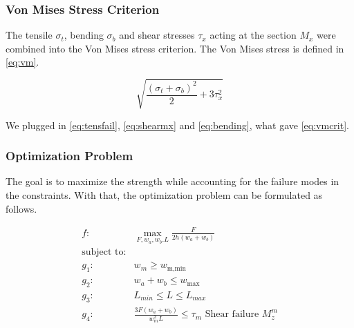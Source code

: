 \subsubsection{Von Mises Stress Criterion}
The tensile $\sigma_t$, bending $\sigma_b$ and shear stresses $\tau_x$ acting at the section $M_x$ were combined into the Von Mises stress criterion. The Von Mises stress is defined in \autoref{eq:vm}.

\begin{equation}
	\label{eq:vm}
	\sqrt{\frac{\left( \sigma_t + \sigma_b \right)^2}{2} + 3\tau_x ^2}
\end{equation}

We plugged in \autoref{eq:tensfail}, \ref{eq:shearmx} and \ref{eq:bending}, what gave \ref{eq:vmcrit}.

\begin{table}[H]
\end{table}


\subsubsection{Optimization Problem}
The goal is to maximize the strength while accounting for the failure modes in the constraints.
With that, the optimization problem can be formulated as follows. 

\begin{align*}
	f: & \max_{F, {w_a}, {w_b}. L} \frac{F}{2h \left(w_a + w_b\right)} \nonumber \\
	\text{subject to:} & \nonumber \\
	g_1: & w_m \ge w_\text{m,min} \\
	g_2: & w_a + w_b \le w_\text{max} \\
	g_3: & L_{min} \le L \le L_{max} \\
	g_4: & \frac{ 3 F \left(w_a + w_b \right) }{ w_m ^2 L} \le \tau_m						\text{ Shear failure } M_z^m 
	\end{align*}	
	\vspace{-8mm}
	
